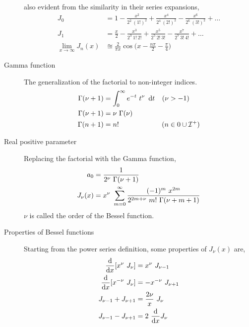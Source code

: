 \begin{description}
        also evident from the similarity in their series expansions,
        \begin{align}
            J_0                               & = 1 - \frac{x^2}{2^2\ (1!)^2}
            + \frac{x^4}{2^4\ (2!)^2} - \frac{x^6}{2^6\ (3!)^2} + \dots                 \\
            J_1                               & = \frac{x}{2} - \frac{x^3}{2^3\ 1!\ 2!}
            + \frac{x^5}{2^5\ 2!\ 3!} - \frac{x^7}{2^7\ 3!\ 4!} + \dots                 \\
            \lim_{x \rightarrow \infty}J_n(x) & \approxeq \frac{2}{\pi x}
            \cos \Bigg( x - \frac{n\pi}{2} - \frac{\pi}{4} \Bigg)
        \end{align}
    \item[Gamma function] The generalization of the factorial to non-integer indices.
        \begin{align}
            \Gamma(\nu+1) & = \int_{0}^{\infty}e^{-t}\ t^{\nu}\ \dl t &
            (\nu          & > -1)                                       \\
            \Gamma(\nu+1) & = \nu\ \Gamma(\nu)                          \\
            \Gamma(n+1)   & = n!                                      &
            (n            & \in 0 \cup \mathcal{I^+})
        \end{align}
    \item[Real positive parameter] Replacing the factorial with the Gamma function,
        \begin{align}
            a_0        & = \frac{1}{2^{\nu}\ \Gamma(\nu+1)}        \\
            J_{\nu}(x) & = x^{\nu}\ \iser{0} \frac{(-1)^m\ x^{2m}}
            {2^{2m + \nu}\ m!\ \Gamma(\nu+m+1)}
        \end{align}
        $ \nu $ is called the order of the Bessel function.
    \item[Properties of Bessel functions] Starting from the power series definition,
        some properties of $ J_{\nu}(x) $ are,
        \begin{align}
            \diff**{x}{[x^{\nu}\ J_{\nu}]}  & = x^{\nu}\ J_{\nu - 1}    \\
            \diff**{x}{[x^{-\nu}\ J_{\nu}]} & = -x^{-\nu}\ J_{\nu + 1}  \\
            J_{\nu-1} + J_{\nu+1}           & = \frac{2\nu}{x}\ J_{\nu} \\
            J_{\nu-1} - J_{\nu+1}           & = 2\ \diff**{x}{J_{\nu}}

\end{align}
\end{description}
